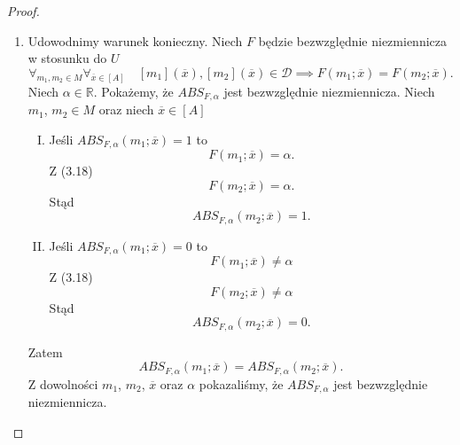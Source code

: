 \documentclass[12pt,a4paper]{report}
\newcommand{\domkniecie}[1]{\left[ {#1} \right] }
\begin{document}
\begin{proof}
\begin{enumerate}
\item
Udowodnimy warunek konieczny.
Niech $F$ będzie bezwzględnie niezmiennicza w stosunku do $U$ 
\begin{equation}
\forall_{m_{1}, m_{2} \in M}  \forall_{\overline{x} \in \domkniecie{A}} \quad \domkniecie{m_1}(\overline{x}), \domkniecie{m_2}(\overline{x})\in \mathcal{D} \implies F(m_{1};\overline{x})=F(m_{2};\overline{x}).
\end{equation}
Niech $\alpha \in \mathbb{R}$. Pokażemy, że $ABS_{F,\alpha}$ jest bezwzględnie niezmiennicza. Niech $m_1$, $m_2 \in M$ oraz niech $\overline{x} \in \domkniecie{A}$ 
\begin{enumerate}[I.]
\item
Jeśli $ABS_{F,\alpha}(m_1;\overline{x})=1$ to 
$$
F(m_1;\overline{x})=\alpha.
$$ 
Z (3.18) 
$$
F(m_2;\overline{x})=\alpha.
$$
Stąd 
$$
ABS_{F,\alpha}(m_2;\overline{x})=1.
$$
\item
Jeśli $ABS_{F,\alpha}(m_1;\overline{x})=0$ to 
$$
F(m_1;\overline{x})\ne \alpha
$$
Z (3.18) 
$$
F(m_2;\overline{x})\ne\alpha
$$
Stąd 
$$
ABS_{F,\alpha}(m_2;\overline{x})=0.
$$
\end{enumerate}
Zatem 
$$
ABS_{F,\alpha}(m_1;\overline{x})=ABS_{F,\alpha}(m_2;\overline{x}).
$$
Z dowolności $m_1$, $m_2$, $\overline{x}$ oraz $\alpha$ pokazaliśmy, że $ABS_{F,\alpha}$ jest bezwzględnie niezmiennicza.


\end{enumerate}
\end{proof}
\end{document}
